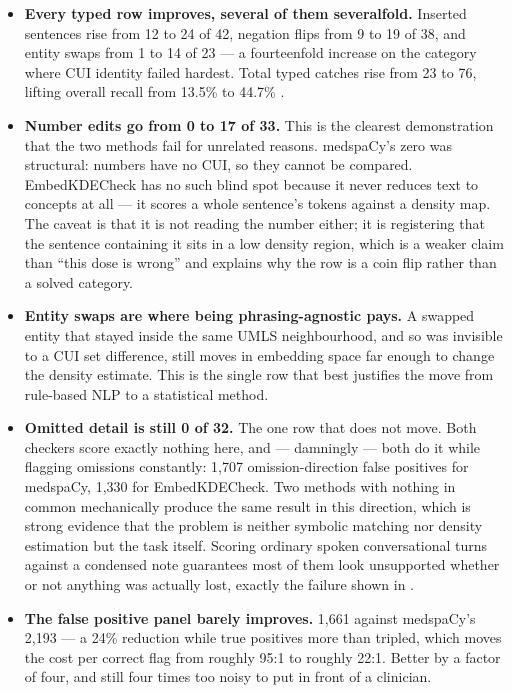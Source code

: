 \begin{itemize}
    \item \textbf{Every typed row improves, several of them severalfold.}
          Inserted sentences rise from 12 to 24 of 42, negation flips from 9 to 19
          of 38, and entity swaps from 1 to 14 of 23 --- a fourteenfold increase on
          the category where CUI identity failed hardest. Total typed catches rise
          from 23 to 76, lifting overall recall from 13.5\% to 44.7\%
          .
    \item \textbf{Number edits go from 0 to 17 of 33.} This is the clearest
          demonstration that the two methods fail for unrelated reasons. medspaCy's
          zero was structural: numbers have no CUI, so they cannot be compared.
          EmbedKDECheck has no such blind spot because it never reduces text to
          concepts at all --- it scores a whole sentence's tokens against a density
          map. The caveat is that it is not reading the number either; it is
          registering that the sentence containing it sits in a low density region,
          which is a weaker claim than ``this dose is wrong'' and explains why the
          row is a coin flip rather than a solved category.
    \item \textbf{Entity swaps are where being phrasing-agnostic pays.} A swapped
          entity that stayed inside the same UMLS neighbourhood, and so was
          invisible to a CUI set difference, still moves in embedding space far
          enough to change the density estimate. This is the single row that best
          justifies the move from rule-based NLP to a statistical method.
    \item \textbf{Omitted detail is still 0 of 32.} The one row that does not move.
          Both checkers score exactly nothing here, and --- damningly --- both do it
          while flagging omissions constantly: 1{,}707 omission-direction false
          positives for medspaCy, 1{,}330 for EmbedKDECheck. Two methods with
          nothing in common mechanically produce the same result in this direction,
          which is strong evidence that the problem is neither symbolic matching nor
          density estimation but the task itself. Scoring ordinary spoken
          conversational turns against a condensed note guarantees most of them look
          unsupported whether or not anything was actually lost, exactly the failure
          shown in .
    \item \textbf{The false positive panel barely improves.} 1{,}661 against
          medspaCy's 2{,}193 --- a 24\% reduction while true positives more than
          tripled, which moves the cost per correct flag from roughly 95:1 to
          roughly 22:1. Better by a factor of four, and still four times too noisy
          to put in front of a clinician.
\end{itemize}

